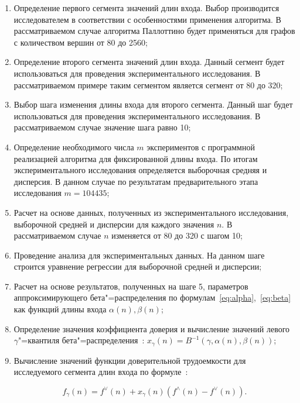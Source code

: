 \documentclass[a4paper, article, 12pt]{extarticle}
\begin{document}
\begin{enumerate}
	\item Определение первого сегмента значений длин входа. Выбор производится исследователем в соответствии с особенностями применения алгоритма. В рассматриваемом случае алгоритма Паллоттино будет применяться для графов с количеством вершин от 80 до 2560;

	\item Определение второго сегмента значений длин входа. Данный сегмент будет использоваться для проведения экспериментального исследования. В рассматриваемом примере таким сегментом является сегмент от 80 до 320;

	\item Выбор шага изменения длины входа для второго сегмента. Данный шаг будет использоваться для проведения экспериментального исследования. В рассматриваемом случае значение шага равно 10;

	\item Определение необходимого числа $m$ экспериментов с программной реализацией алгоритма для фиксированной длины входа. По итогам экспериментального исследования определяется выборочная средняя и дисперсия. В данном случае по результатам предварительного этапа исследования $m = 104435$;

	\item Расчет на основе данных, полученных из экспериментального исследования, выборочной средней и дисперсии для каждого значения $n$. В рассматриваемом случае $n$ изменяется от 80 до 320 с шагом 10;

	\item Проведение анализа для экспериментальных данных. На данном шаге строится уравнение регрессии для выборочной средней и дисперсии;

	\item Расчет на основе результатов, полученных на шаге 5, параметров аппроксимирующего бета"=распределения по формулам~\eqref{eq:alpha},~\eqref{eq:beta} как функций длины входа $\alpha(n), \beta(n)$;

	\item Определение значения коэффициента доверия и вычисление значений левого $\gamma$"=квантиля бета"=распределения~\cite{petrushyn_ulyanov_definitions}: $x_\gamma(n) = B^{-1}(\gamma, \alpha(n), \beta(n))$;

	\item Вычисление значений функции доверительной трудоемкости для исследуемого сегмента длин входа по формуле~\cite{petrushyn_ulyanov_analysis}:

	\begin{equation}\label{eq:final_complexity_fucntion}
		f_\gamma(n) = f^\vee(n) + x_\gamma(n) (f^\wedge(n) - f^\vee(n)).
	\end{equation}
\end{enumerate}
\end{document}
